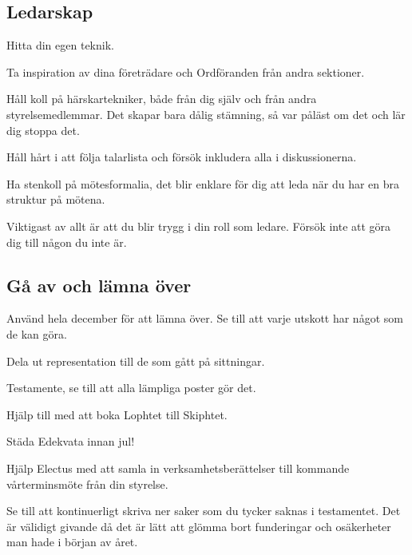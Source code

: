 \documentclass[10pt]{article}
\begin{document}
    \subsection{Ledarskap}
    
    \begin{dashlist}
        \item Hitta din egen teknik.
        \item Ta inspiration av dina företrädare och Ordföranden från andra sektioner.
        \item Håll koll på härskartekniker, både från dig själv och från andra styrelsemedlemmar. Det skapar bara dålig stämning, så var påläst om det och lär dig stoppa det.
        \item Håll hårt i att följa talarlista och försök inkludera alla i diskussionerna.
        \item Ha stenkoll på mötesformalia, det blir enklare för dig att leda när du har en bra struktur på mötena.
        \item Viktigast av allt är att du blir trygg i din roll som ledare. Försök inte att göra dig till någon du inte är.
    \end{dashlist}
    
    \subsection{Gå av och lämna över}
    
    \begin{dashlist}
        \item Använd hela december för att lämna över. Se till att varje utskott har något som de kan göra.
        \item Dela ut representation till de som gått på sittningar.
        \item Testamente, se till att alla lämpliga poster gör det.
        \item Hjälp till med att boka Lophtet till Skiphtet.
        \item Städa Edekvata innan jul!
        \item Hjälp Electus med att samla in verksamhetsberättelser till kommande vårterminsmöte från din styrelse.
        \item Se till att kontinuerligt skriva ner saker som du tycker saknas i testamentet. Det är välidigt givande då det är lätt att glömma bort funderingar och osäkerheter man hade i början av året. 
    \end{dashlist}
    
\end{document}
